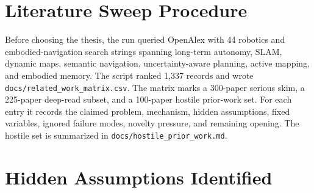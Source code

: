 \documentclass{article}
\begin{document}



\appendix

\section{Literature Sweep Procedure}

Before choosing the thesis, the run queried OpenAlex with 44 robotics and embodied-navigation search strings spanning long-term autonomy, SLAM, dynamic maps, semantic navigation, uncertainty-aware planning, active mapping, and embodied memory. The script ranked 1,337 records and wrote \texttt{docs/related\_work\_matrix.csv}. The matrix marks a 300-paper serious skim, a 225-paper deep-read subset, and a 100-paper hostile prior-work set. For each entry it records the claimed problem, mechanism, hidden assumptions, fixed variables, ignored failure modes, novelty pressure, and remaining opening. The hostile set is summarized in \texttt{docs/hostile\_prior\_work.md}.

\section{Hidden Assumptions Identified}
\end{document}
